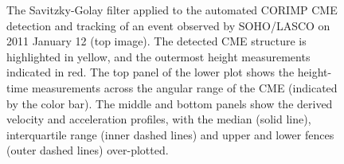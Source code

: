 \documentclass[structabstract]{aa}
\begin{document}
\begin{figure}[!t]
\centering
{}
\caption{The Savitzky-Golay filter applied to the automated CORIMP CME detection and tracking of an event observed by SOHO/LASCO on 2011 January 12 (top image). The detected CME structure is highlighted in yellow, and the outermost height measurements indicated in red. The top panel of the lower plot shows the height-time measurements across the angular range of the CME (indicated by the color bar). The middle and bottom panels show the derived velocity and acceleration profiles, with the median (solid line), interquartile range (inner dashed lines) and upper and lower fences (outer dashed lines) over-plotted.}
\label{fig_savgol_CME_CORIMP}
\end{figure}


\end{document}
